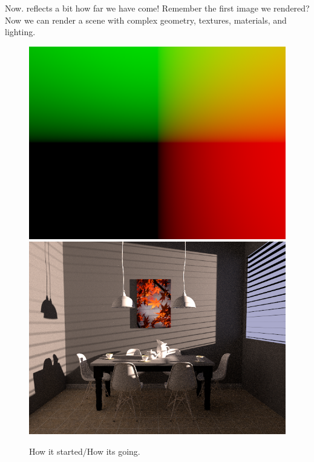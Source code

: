 Now. reflects a bit how far we have come! Remember the first image we rendered? Now we can render a scene with complex geometry, textures, materials, and lighting. 
\begin{figure}[ht]
    \centering
    \includegraphics[width=0.40\linewidth]{imgs/hw_1_1_after.png}
    \includegraphics[width=0.40\linewidth]{imgs/hw_4_3f.png}
    \caption{How it started/How its going.}
\end{figure}

